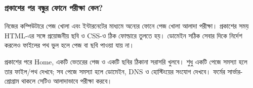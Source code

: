 \subsubsection{প্রকাশের পর বন্ধুর ফোনে পরীক্ষা কেন?}
নিজের কম্পিউটারে পেজ খোলা এবং ইন্টারনেটের মাধ্যমে অন্যের ফোনে পেজ খোলা আলাদা পরীক্ষা। প্রকাশের সময় HTML-এর সঙ্গে প্রয়োজনীয় ছবি ও CSS-ও ঠিক ফোল্ডারে তুলতে হয়। ডোমেইন সঠিক সেবার দিকে নির্দেশ করলেও ফাইলের পথ ভুল হলে পেজ বা ছবি পাওয়া যায় না।

প্রকাশের পরে Home, একটি ভেতরের পেজ ও একটি ছবির ঠিকানা সরাসরি খুলবে। শুধু একটি পেজে সমস্যা হলে তার ফাইল/পথ দেখবে; সব পেজে সমস্যা হলে ডোমেইন, DNS ও হোস্টিংয়ের সংযোগ দেখবে। ফর্মের সার্ভার-প্রোগ্রাম থাকলে সেটিও আলাদাভাবে পরীক্ষা করবে।
